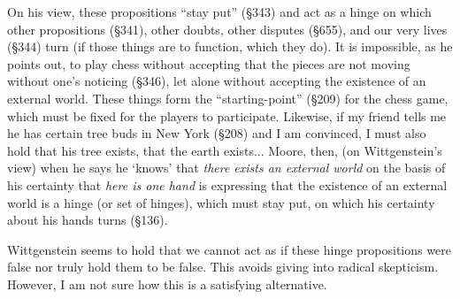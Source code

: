 \documentclass[man,12pt,natbib]{apa6}
\begin{document}
On his view, these propositions ``stay put'' (\S 343) and act as a hinge on
which other propositions (\S 341), other doubts, other disputes (\S 655), and
our very lives (\S 344) turn (if those things are to function, which they do).
It is impossible, as he points out, to play chess without accepting that the
pieces are not moving without one's noticing (\S 346), let alone without
accepting the existence of an external world. These things form the
``starting-point'' (\S 209) for the chess game, which must be fixed for the
players to participate.
Likewise, if my friend tells me he has certain tree buds in New York (\S 208)
and I am convinced, I must also hold that his tree exists, that the earth
exists...
Moore, then, (on Wittgenstein's view) when he says he `knows'
that \emph{there exists an external world} on the basis of his certainty
that \emph{here is one hand} is expressing that the existence of an external
world is a hinge (or set of hinges), which must stay put, on which his
certainty about his hands turns (\S 136).

Wittgenstein seems to hold that we cannot act as if these hinge propositions
were false nor truly
hold them to be false. This avoids giving
into radical skepticism. However, I am not sure how this is a satisfying
alternative.

\clearpage

\end{document}
